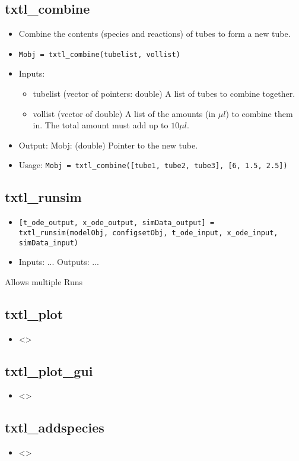 \documentclass[english]{report}
\begin{document}
		\subsection*{txtl\_combine}
			\begin{itemize}
			\item Combine the contents (species and reactions) of tubes to form a new tube. 
			\item \texttt{Mobj = txtl\_combine(tubelist, vollist)}
			\item Inputs: 
			\begin{itemize}
			\item tubelist (vector of pointers: double) A list of tubes to combine together. 
			\item vollist (vector of double) A list of the amounts (in $\mu l$) to combine them in. The total amount must add up to $10 \mu l$.
			\end{itemize}
			\item Output: Mobj: (double) Pointer to the new tube. 
			\item Usage: \texttt{Mobj = txtl\_combine([tube1, tube2, tube3], [6, 1.5, 2.5])}
			\end{itemize}		
		\subsection*{txtl\_runsim}
			\begin{itemize}
			\item \texttt{[t\_ode\_output, x\_ode\_output, simData\_output] = txtl\_runsim(modelObj, configsetObj, t\_ode\_input, x\_ode\_input, simData\_input)}
			\item Inputs: ... Outputs: ...
			\end{itemize}		
		Allows multiple Runs		
		\subsection*{txtl\_plot}
			\begin{itemize}
			\item <>
			\end{itemize}		
		\subsection*{txtl\_plot\_gui}
			\begin{itemize}
			\item <>
			\end{itemize}		
		\subsection*{txtl\_addspecies}
			\begin{itemize}
			\item <>
			\end{itemize}		
\end{document}
